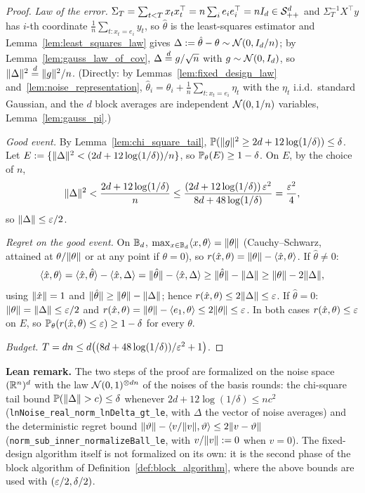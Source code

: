 \begin{proof}
\emph{Law of the error.} $\Sigma_T = \sum_{t<T}x_tx_t^\top = n\sum_ie_ie_i^\top = nI_d \in \mathcal{S}_{++}^{d}$ and
$\Sigma_T^{-1}X^\top y$ has $i$-th coordinate $\frac1n\sum_{t : x_t = e_i}y_t$, so $\hat\theta$ is
the least-squares estimator and Lemma~\ref{lem:least_squares_law} gives
$\Delta := \hat\theta - \theta \sim \mathcal{N}(0, I_d/n)$; by Lemma~\ref{lem:gauss_law_of_cov},
$\Delta \overset{d}{=} g/\sqrt n$ with $g \sim \mathcal{N}(0,I_d)$, so $\lVert \Delta \rVert^2 \overset{d}{=} \lVert g \rVert^2/n$.
(Directly: by Lemmas~\ref{lem:fixed_design_law} and~\ref{lem:noise_representation},
$\hat\theta_i = \theta_i + \frac1n\sum_{t : x_t = e_i}\eta_t$ with the $\eta_t$ i.i.d.\ standard
Gaussian, and the $d$ block averages are independent $\mathcal{N}(0,1/n)$ variables,
Lemma~\ref{lem:gauss_pi}.)

\emph{Good event.} By Lemma~\ref{lem:chi_square_tail},
$\mathbb{P}(\lVert g \rVert^2 \ge 2d + 12\log(1/\delta)) \le \delta$. Let $E := \{\lVert \Delta \rVert^2 <
(2d + 12\log(1/\delta))/n\}$, so $\mathbb{P}_\theta(E) \ge 1 - \delta$. On $E$, by the choice of $n$,
\[
  \lVert \Delta \rVert^2 < \frac{2d + 12\log(1/\delta)}{n}
  \le \frac{(2d + 12\log(1/\delta))\,\varepsilon^2}{8d + 48\log(1/\delta)} = \frac{\varepsilon^2}{4},
\]
so $\lVert \Delta \rVert \le \varepsilon/2$.

\emph{Regret on the good event.} On $\mathbb{B}_d$, $\max_{x\in\mathbb{B}_d}\langle x, \theta \rangle = \lVert \theta \rVert$
(Cauchy--Schwarz, attained at $\theta/\lVert \theta \rVert$ or at any point if $\theta = 0$), so
$r(\hat{x},\theta) = \lVert \theta \rVert - \langle \hat{x}, \theta \rangle$. If $\hat\theta \ne 0$:
\[
  \langle \hat{x}, \theta \rangle = \langle \hat{x}, \hat\theta \rangle - \langle \hat{x}, \Delta \rangle = \lVert \hat\theta \rVert - \langle \hat{x}, \Delta \rangle
  \ge \lVert \hat\theta \rVert - \lVert \Delta \rVert \ge \lVert \theta \rVert - 2\lVert \Delta \rVert,
\]
using $\lVert \hat{x} \rVert = 1$ and $\lVert \hat\theta \rVert \ge \lVert \theta \rVert - \lVert \Delta \rVert$; hence
$r(\hat{x},\theta) \le 2\lVert \Delta \rVert \le \varepsilon$. If $\hat\theta = 0$: $\lVert \theta \rVert = \lVert \Delta \rVert
\le \varepsilon/2$ and $r(\hat{x},\theta) = \lVert \theta \rVert - \langle e_1, \theta \rangle \le 2\lVert \theta \rVert \le \varepsilon$.
In both cases $r(\hat{x},\theta) \le \varepsilon$ on $E$, so
$\mathbb{P}_\theta(r(\hat{x},\theta) \le \varepsilon) \ge 1-\delta$ for every $\theta$.

\emph{Budget.} $T = dn \le d\big((8d + 48\log(1/\delta))/\varepsilon^2 + 1\big)$.
\end{proof}

\textbf{Lean remark.} The two steps of the proof are formalized on the noise space
$(\mathbb{R}^n)^d$ with the law $\mathcal{N}(0,1)^{\otimes dn}$ of the noises of the basis rounds: the
chi-square tail bound $\mathbb{P}(\lVert \Delta \rVert > c) \le \delta$ whenever
$2d + 12\log(1/\delta) \le nc^2$ (\texttt{lnNoise\_real\_norm\_lnDelta\_gt\_le}, with
$\Delta$ the vector of noise averages) and the deterministic regret bound
$\lVert \vartheta \rVert - \langle v/\lVert v \rVert, \vartheta \rangle \le 2\lVert v - \vartheta \rVert$
(\texttt{norm\_sub\_inner\_normalizeBall\_le}, with $v/\lVert v \rVert := 0$ when $v = 0$). The
fixed-design algorithm itself is not formalized on its own: it is the second phase of the
block algorithm of Definition~\ref{def:block_algorithm}, where the above bounds are used
with $(\varepsilon/2, \delta/2)$.

